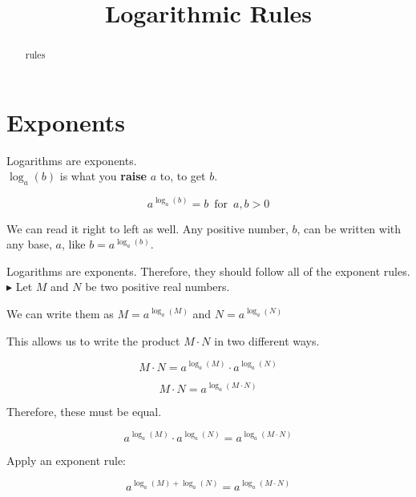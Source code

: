 \documentclass{ximera}
\title{Logarithmic Rules}
\begin{document}
\begin{abstract}
rules
\end{abstract}
\maketitle
















\section{Exponents}

Logarithms are exponents. \\


$\log_a(b)$ is what you \textbf{\textcolor{red!90!darkgray}{raise}} $a$ to, to get $b$.

\[    a^{\log_a(b)}  = b    \, \text{ for } \,  a,b > 0     \]


We can read it right to left as well.  Any positive number, $b$, can be written with any base, $a$, like $b = a^{\log_a(b)}$.






Logarithms are exponents. Therefore, they should follow all of the exponent rules. \\



$\blacktriangleright$  Let $M$ and $N$ be two positive real numbers.

We can write them as $M = a^{\log_a(M)}$ and $N = a^{\log_a(N)}$


This allows us to write the product $M \cdot N$ in two different ways.



\[   M \cdot N = a^{\log_a(M)} \cdot a^{\log_a(N)}                    \]

\[   M \cdot N = a^{\log_a(M \cdot N)}                  \]


Therefore, these must be equal.


\[    a^{\log_a(M)} \cdot a^{\log_a(N)}     =   a^{\log_a(M \cdot N)}                \]


Apply an exponent rule:


\[    a^{\log_a(M)+\log_a(N)}    =   a^{\log_a(M \cdot N)}                \]
\end{document}
